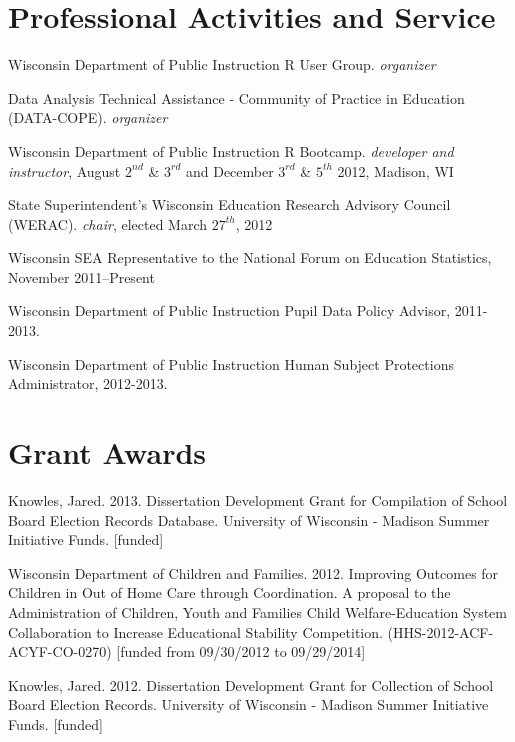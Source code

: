 \documentclass[margin,line]{res}
\begin{document}
\begin{resume}
\section{\sc Professional Activities and Service}

Wisconsin Department of Public Instruction R User Group. \emph{organizer}

Data Analysis Technical Assistance - Community of Practice in Education (DATA-COPE). \emph{organizer} 

Wisconsin Department of Public Instruction R Bootcamp. \emph{developer and instructor}, August $2^{nd}$ \& $3^{rd}$ and December $3^{rd}$ \& $5^{th}$ 2012, Madison, WI

State Superintendent's Wisconsin Education Research Advisory Council (WERAC). \emph{chair}, elected March $27^{th}$, 2012

Wisconsin SEA Representative to the National Forum on Education Statistics, November 2011--Present

Wisconsin Department of Public Instruction Pupil Data Policy Advisor, 2011-2013.

Wisconsin Department of Public Instruction Human Subject Protections Administrator, 2012-2013. 

\section{\sc Grant Awards}

Knowles, Jared. 2013. Dissertation Development Grant for Compilation of School Board Election Records Database. University of Wisconsin - Madison Summer Initiative Funds. [funded]

Wisconsin Department of Children and Families. 2012. Improving Outcomes for Children in Out of Home Care through Coordination. A proposal to the Administration of Children, Youth and Families 
 Child Welfare-Education System Collaboration to Increase Educational Stability Competition. (HHS-2012-ACF-ACYF-CO-0270) [funded from 09/30/2012 to 09/29/2014]

Knowles, Jared. 2012. Dissertation Development Grant for Collection of School Board Election Records. University of Wisconsin - Madison Summer Initiative Funds. [funded]


\end{resume}
\end{document}
